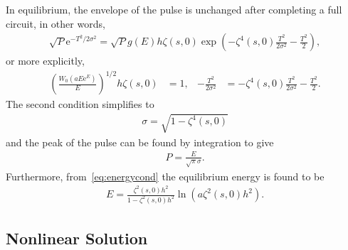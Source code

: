 \documentclass[12pt]{article}
\begin{document}
In equilibrium, the envelope of the pulse is unchanged after completing a full circuit, in other words,
\begin{align*}
	\sqrt{P} \textrm{e}^{-T^2 / 2 \sigma^2} = 
	\sqrt{P} g(E) h \zeta(s, 0) \exp \left( -\zeta^4(s, 0) \frac{T^2}{2 \sigma^2} - \frac{T^2}{2} \right),
\end{align*}
or more explicitly,
\begin{align}
\label{eq:energycond}
	\left( \frac{W_0(a E \textrm{e}^E)}{E} \right)^{1/2} h \zeta(s, 0) &= 1,&
	-\frac{T^2}{2 \sigma^2} &= -\zeta^4(s, 0) \frac{T^2}{2 \sigma^2} - \frac{T^2}{2}.
\end{align}
The second condition simplifies to
\begin{align*}
	\sigma = \sqrt{1 - \zeta^4(s, 0)}
\end{align*}
and the peak of the pulse can be found by integration to give
\begin{align*}
	P = \frac{E}{\sqrt{\pi} \sigma}.
\end{align*}
Furthermore, from~\eqref{eq:energycond} the equilibrium energy is found to be
\begin{align}
	E = \frac{\zeta^2(s, 0) h^2}{1 - \zeta^2(s, 0) h^2} \ln \left( a \zeta^2(s, 0) h^2 \right).
	\label{eq:equilenergy}
\end{align}

\subsection{Nonlinear Solution}
\end{document}
